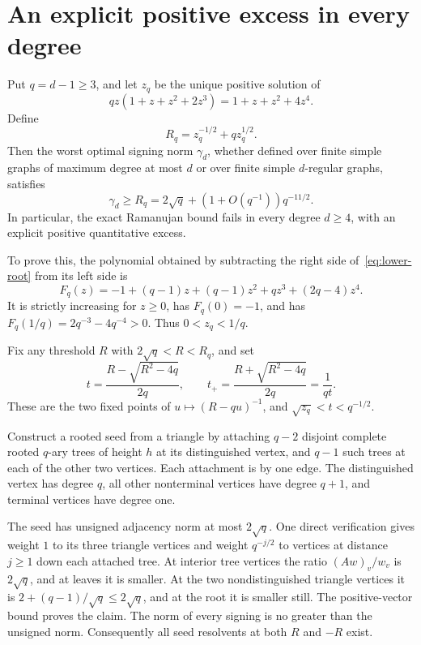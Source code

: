 \documentclass[11pt]{article}
\numberwithin{equation}{section}
\begin{document}
\section{An explicit positive excess in every degree}

Put $q=d-1\ge3$, and let $z_q$ be the unique positive solution of
\begin{equation}\label{eq:lower-root}
 qz(1+z+z^2+2z^3)=1+z+z^2+4z^4.
\end{equation}
Define
\[
 R_q=z_q^{-1/2}+qz_q^{1/2}.
\]
Then the worst optimal signing norm $\gamma_d$, whether defined over
finite simple graphs of maximum degree at most $d$ or over finite
simple $d$-regular graphs, satisfies
\begin{equation}\label{eq:explicit-lower}
 \gamma_d\ge R_q
 =2\sqrt q+(1+O(q^{-1}))q^{-11/2}.
\end{equation}
In particular, the exact Ramanujan bound fails in every degree
$d\ge4$, with an explicit positive quantitative excess.

To prove this, the polynomial obtained by subtracting the right side
of~\eqref{eq:lower-root} from its left side is
\[
 F_q(z)=-1+(q-1)z+(q-1)z^2+qz^3+(2q-4)z^4.
\]
It is strictly increasing for $z\ge0$, has $F_q(0)=-1$, and has
$F_q(1/q)=2q^{-3}-4q^{-4}>0$. Thus $0<z_q<1/q$.

Fix any threshold $R$ with $2\sqrt q<R<R_q$, and set
\[
 t=\frac{R-\sqrt{R^2-4q}}{2q},\qquad
 t_+=\frac{R+\sqrt{R^2-4q}}{2q}=\frac1{qt}.
\]
These are the two fixed points of $u\mapsto(R-qu)^{-1}$, and
$\sqrt{z_q}<t<q^{-1/2}$.

Construct a rooted seed from a triangle by attaching $q-2$ disjoint
complete rooted $q$-ary trees of height $h$ at its distinguished
vertex, and $q-1$ such trees at each of the other two vertices.
Each attachment is by one edge. The distinguished vertex has degree
$q$, all other nonterminal vertices have degree $q+1$, and terminal
vertices have degree one.

The seed has unsigned adjacency norm at most $2\sqrt q$. One direct
verification gives weight $1$ to its three triangle vertices and
weight $q^{-j/2}$ to vertices at distance $j\ge1$ down each attached
tree. At interior tree vertices the ratio $(Aw)_v/w_v$ is
$2\sqrt q$, and at leaves it is smaller. At the two nondistinguished
triangle vertices it is $2+(q-1)/\sqrt q\le2\sqrt q$, and at the
root it is smaller still. The positive-vector bound proves the claim.
The norm of every signing is no greater than the unsigned norm.
Consequently all seed resolvents at both $R$ and $-R$ exist.
\end{document}
